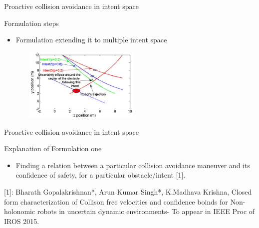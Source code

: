 \documentclass{beamer}
\begin{document}
\begin{frame}{Proactive collision avoidance in intent space}
\begin{block}{Formulation steps}
\begin{itemize}
\item{Formulation extending it to multiple intent space}
\end{itemize}
\begin{figure}
\centering
\includegraphics[width= 6.1cm, height=3.5cm]{fig2.eps}
\end{figure}
\end{block}
\end{frame}
\begin{frame}{Proactive collision avoidance in intent space}
\begin{block}{Explanation of Formulation one}
\begin{itemize}
\item{Finding a relation between a particular collision avoidance maneuver and its confidence of safety, for a particular obstacle/intent [1].}


\end{itemize}
[1]: Bharath Gopalakrishnan*, Arun Kumar Singh*, K.Madhava Krishna, Closed form characterization of Collison free velocities and confidence boinds for Non- holonomic robots in uncertain dynamic environments- To appear in IEEE Proc of IROS 2015.

\end{block}
\end{frame}
\end{document}
